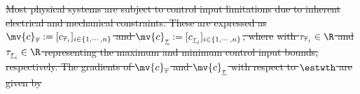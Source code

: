 \documentclass[letterpaper, journal]{IEEEtran}
\providecommand{\DIFdel}[1]{{\protect\color{red}\sout{#1}}} %
\begin{document}
\DIFdel{Most physical systems are subject to control input limitations due to inherent electrical and mechanical constraints. 
These are expressed as $\mv{c}_{\overline \tau}:= [c_{\overline \tau_i}]_{i\in\{1,\cdots,n\}}$ and $\mv{c}_{\underline\tau}:= [c_{\underline\tau_i}]_{i\in\{1,\cdots,n\}}$, where
}%
\DIFdel{with $\tau_{\overline \tau_i}\in\R$ and $\tau_{\underline\tau_i}\in\R$ representing the maximum and minimum control input bounds, respectively.
The gradients of $\mv{c}_{\overline \tau}$ and $\mv{c}_{\underline\tau}$ with respect to $\estwth$ are given by
}%
\end{document}
